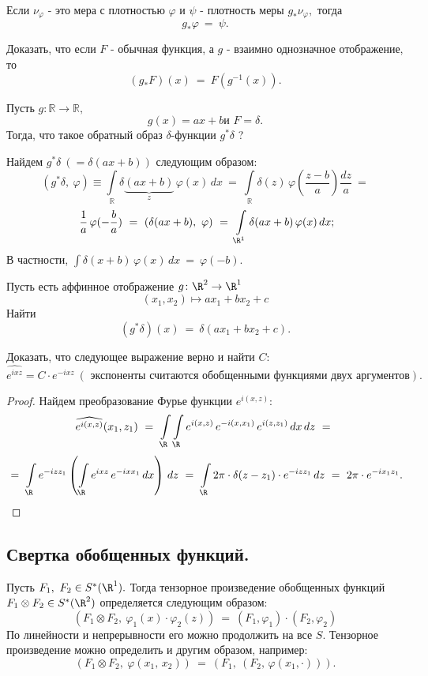 \documentclass[a4paper]{article}
\newcommand{\ff} {\varphi}
\newcommand{\mro} {\R^1}
\newcommand{\inr} {\int \limits_{\mathbb R}}
\newcommand{\il} {\int\limits_}
\newcommand{\w}{\widehat}
\newcommand{\gn}{g_{*}}
\newcommand{\gv}{g^{*}}
\newcommand{\Rr}{\R}
\begin{document}
\begin{note}
Если $\nu_\ff$ - это мера с плотностью $\ff$ и $\psi$ - плотность
меры $\gn \nu_\ff,$ тогда $$\gn \ff\ = \ \psi.$$
\end{note}

\begin{problem}
Доказать, что если $F$ - обычная функция, а $g$ - взаимно
однозначное отображение, то
$$
(\gn F)(x)\ = \ F (g^{-1}(x)).
$$
\end{problem}

\begin{ex}
Пусть $g: \mathbb R \rightarrow \mathbb R,$
$$g(x) = ax + b \mbox{
и }F = \delta.$$  Тогда, что такое обратный образ $\delta$-функции
$\gv \delta$ ?

Найдем $\gv \delta \ (= \delta (ax + b))$ следующим образом:
$$
(\gv \delta, \ \ff) \equiv \inr \delta \underbrace{(ax + b)}_{z}
\, \ff (x)\, dx \ = \ \inr \delta(z) \, \ff
\left(\frac{z-b}{a}\right) \frac{dz}{a} \ =
$$
$$
\ \frac{1}{a}\, \ff (- \frac{b}{a})\ = \ (\delta (ax + b) , \
\ff)\ =\ \il{\mro} \delta (ax + b) \, \ff (x)\, dx;
$$
В частности, $ \int \delta (x+ b) \, \ff (x) \, dx\ = \ \ff (-b).$
\end{ex}

\begin{problem}
Пусть есть аффинное отображение $g\colon \R^2 \rightarrow
\mro$
$$
(x_1, x_2) \mapsto ax_1 + bx_2 + c
$$
Найти
$$
(\gv \delta)(x)\ = \ \delta (ax_1 + bx_2 + c).
$$

\end{problem}

\begin{problem}
Доказать, что следующее выражение верно и найти $C$:
$$\w{e^{ixz}}
= C\cdot e^{-ixz} \ (\mbox{ экспоненты считаются обобщенными
функциями двух аргументов}).$$
\end{problem}
\begin{proof}
Найдем преобразование Фурье функции $e^{i(x,z)}\colon$
$$
\w{e^{i (x, z)}} (x_1, z_1)\ = \ \il{\Rr} \il{\Rr} e^{i (x, z)} \,
e^{-i (x, x_1)}\, e^{i (z, z_1)}\, dx \, dz\ = \
$$
$$
\ = \ \il{\Rr} e^{- iz z_1} \left( \il{\Rr} e^{i x z} \, e^{-i x
x_1} \, dx \right) \, dz\ = \ \il{\Rr} 2 \pi \cdot \delta (z -
z_1) \cdot e^{- i z z_1} \, dz\ = \ 2 \pi \cdot e^{-i x_1 z_1}.
$$
\end{proof}

\subsection{Свертка обобщенных функций.}
\begin{df}
Пусть $F_1, \ F_2 \in S^{*} (\mro).$ Тогда тензорное произведение
обобщенных функций $F_1 \otimes F_2 \in S^{*} (\R^2)$
определяется следующим образом:
$$
\left( F_1 \otimes F_2, \ \ff_1 (x) \cdot \ff_2 (z)\right)\ = \
(F_1, \ff_1)\cdot (F_2, \ff_2)
$$
По линейности и непрерывности его можно продолжить на все $S.$
Тензорное произведение можно определить и другим образом,
например:
$$
(F_1 \otimes F_2, \ \ff(x_1, \, x_2))\ = \ (F_1, \ (F_2, \,
\ff(x_1, \cdot))).
$$
\end{df}
\end{document}
